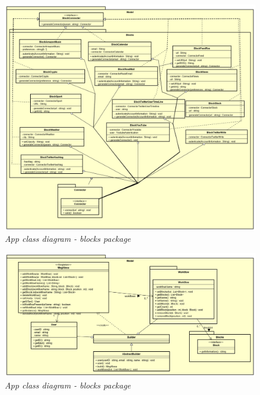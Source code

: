 \begin{figure} [H]
	\centering
	\includegraphics[scale=0.3]{./images/BlockConnection.png}
	\caption{\textit{App class diagram - blocks package}}\label{BlockConnection}
\end{figure}

\begin{figure} [H]
	\centering
	\includegraphics[scale=0.3]{./images/Model.png}
	\caption{\textit{App class diagram - blocks package}}\label{Model}
\end{figure}